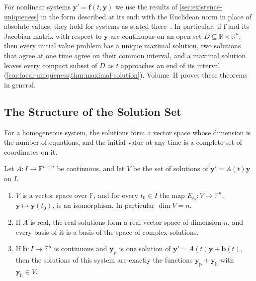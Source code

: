 For nonlinear systems $\mathbf y'=\mathbf f(t,\mathbf y)$ we use the results of \cref{sec:existence-uniqueness} in the form described at its end: with the Euclidean norm in place of absolute values, they hold for systems as stated there~\cite[Chap.~II]{hartman2002}. In particular, if $\mathbf f$ and its Jacobian matrix with respect to $\mathbf y$ are continuous on an open set $D\subseteq\mathbb R\times\mathbb R^n$, then every initial value problem has a unique maximal solution, two solutions that agree at one time agree on their common interval, and a maximal solution leaves every compact subset of $D$ as $t$ approaches an end of its interval (\cref{cor:local-uniqueness,thm:maximal-solution}). Volume~II proves these theorems in general.

\subsection{The Structure of the Solution Set}

For a homogeneous system, the solutions form a vector space whose dimension is the number of equations, and the initial value at any time is a complete set of coordinates on it.

\begin{theorem}
\label{thm:system-solution-space}
Let $A\colon I\to\mathbb F^{n\times n}$ be continuous, and let $V$ be the set of solutions of $\mathbf y'=A(t)\mathbf y$ on $I$.
\begin{enumerate}
\item $V$ is a vector space over $\mathbb F$, and for every $t_0\in I$ the map $E_{t_0}\colon V\to\mathbb F^n$, $\mathbf y\mapsto\mathbf y(t_0)$, is an isomorphism. In particular $\dim V=n$.
\item If $A$ is real, the real solutions form a real vector space of dimension $n$, and every basis of it is a basis of the space of complex solutions.
\item If $\mathbf b\colon I\to\mathbb F^n$ is continuous and $\mathbf y_{\mathrm p}$ is one solution of $\mathbf y'=A(t)\mathbf y+\mathbf b(t)$, then the solutions of this system are exactly the functions $\mathbf y_{\mathrm p}+\mathbf y_{\mathrm h}$ with $\mathbf y_{\mathrm h}\in V$.
\end{enumerate}
\end{theorem}

